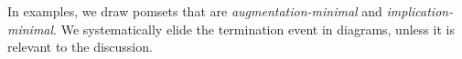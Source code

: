 
In examples, we draw pomsets that are \emph{augmentation\hyp{}minimal} and
\emph{implication\hyp{}minimal}.  We systematically elide the termination
event in diagrams, unless it is relevant to the discussion.

